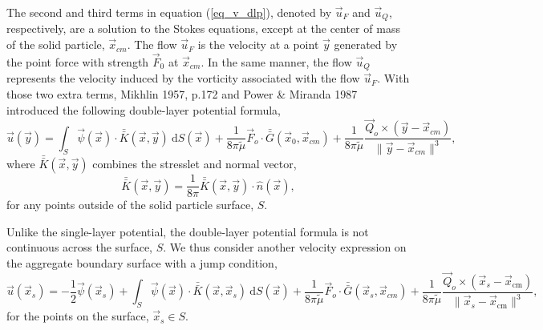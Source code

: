 The second and third terms in equation (\ref{eq_v_dlp}), denoted by $\vec{u}_F$ and $\vec{u}_Q$, respectively, are a solution to the Stokes equations, except at the center of mass of the solid particle, $\vec{x}_{cm}$.
The flow $\vec{u}_F$ is the velocity at a point $\vec{y}$ generated by the point force with strength $\vec{F}_0$ at $\vec{x}_{cm}$. 
In the same manner, the flow $\vec{u}_Q$ represents the velocity induced by the vorticity associated with the flow $\vec{u}_F$.
With those two extra terms, Mikhlin 1957, p.172 \cite{smithies_integral_1959} and Power \& Miranda 1987 \cite{power_second_1987} introduced the following double-layer potential formula,
\begin{equation}
\vec{u}(\vec{y}) = \int_S
\vec{\psi}(\vec{x}) \cdot  \bar{\bar{K}}(\vec{x},\vec{y})  \ \text{d}S(\vec{x}) + 
\frac{1}{8 \pi \tilde{\mu} }\vec{F}_o \cdot \bar{\bar{G}}(\vec{x}_{0},\vec{x}_{cm})
+\frac{1}{8 \pi \tilde{\mu} } \frac{\vec{Q}_o \times  (\vec{y}   - \vec{x}_{cm} ) }{\| \vec{y}   - \vec{x}_{cm} \|^3 },
 \label{eq_BI_DL}
\end{equation}
where $ \bar{\bar{K}}(\vec{x},\vec{y})$ combines the stresslet and normal vector,
\begin{equation*}
	\bar{\bar{K}}(\vec{x},\vec{y})
	= \frac{1}{8 \pi} \bar{\bar{K}}(\vec{x},\vec{y})  \cdot \hat{n}(\vec{x}),
\end{equation*}
for any points outside of the solid particle surface, $S$.

\par
Unlike the single-layer potential, the double-layer potential formula is not continuous across the surface, $S$.
We thus consider another velocity expression on the aggregate boundary surface with a jump condition,
\begin{equation}
\vec{u}(\vec{x}_s) = -\frac{1}{2} \vec{\psi}(\vec{x}_s) 
+\int_S  \vec{\psi}(\vec{x})  \cdot \bar{\bar{K}} (\vec{x},\vec{x}_s) \ \text{d}S(\vec{x}) 
+\frac{1}{8 \pi \tilde{\mu} } \vec{F}_o \cdot \bar{\bar{G}}(\vec{x}_{s},\vec{x}_{cm})
+\frac{1}{8 \pi \tilde{\mu} } \frac{\vec{Q}_o \times  (\vec{x}_s   - \vec{x}_{\text{cm}} ) }{\| \vec{x}_s  - \vec{x}_{\text{cm}} \|^3 },
\label{eq_BI_DL_on}
\end{equation}
for the points on the surface, $\vec{x}_s \in S$.
